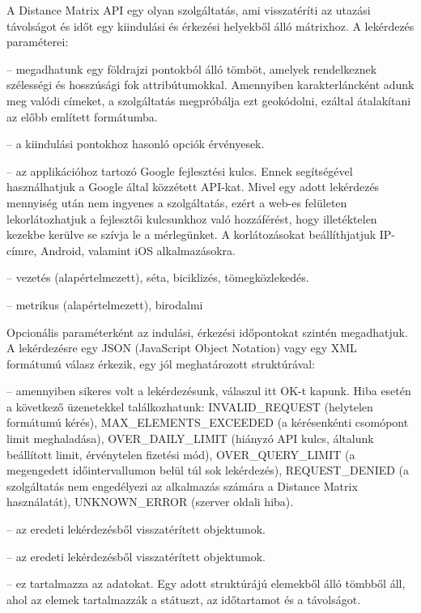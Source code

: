 A Distance Matrix API\cite{distance} egy olyan szolgáltatás, ami visszatéríti az utazási távolságot és időt egy kiindulási és érkezési helyekből álló mátrixhoz. A lekérdezés paraméterei:

\begin{description}
	\setlength{\itemsep}{0.04mm}
	\item[origins (kiindulási pontok)] -- megadhatunk egy földrajzi pontokból álló tömböt, amelyek rendelkeznek szélességi és hosszúsági fok attribútumokkal. Amennyiben karakterláncként adunk meg valódi címeket, a szolgáltatás megpróbálja ezt geokódolni, ezáltal átalakítani az előbb említett formátumba.
	\item[destinations (érkezési pontok)] --  a kiindulási pontokhoz hasonló opciók érvényesek.
	\item[key (kulcs)] -- az applikációhoz tartozó Google fejlesztési kulcs. Ennek segítségével használhatjuk a Google által közzétett API-kat. Mivel egy adott lekérdezés mennyiség után nem ingyenes a szolgáltatás, ezért a web-es felületen lekorlátozhatjuk a fejlesztői kulcsunkhoz való hozzáférést, hogy illetéktelen kezekbe kerülve se szívja le a mérlegünket. A korlátozásokat beállíthjatjuk IP-címre, Android, valamint iOS alkalmazásokra.
	\item[utazási mód (opcionális)] -- vezetés (alapértelmezett), séta, biciklizés, tömegközlekedés.
	\item[mértékegység (opcionális)] -- metrikus (alapértelmezett), birodalmi
\end{description}

Opcionális paraméterként az indulási, érkezési időpontokat szintén megadhatjuk. A lekérdezésre egy JSON (JavaScript Object Notation) vagy egy XML formátumú válasz érkezik, egy jól meghatározott struktúrával:

\begin{description}
	\setlength{\itemsep}{0.04mm}
	\item[státusz] -- amennyiben sikeres volt a lekérdezésunk, válaszul itt OK-t kapunk. Hiba esetén a következő üzenetekkel találkozhatunk: INVALID\_REQUEST (helytelen formátumú kérés), MAX\_ELEMENTS\_EXCEEDED (a kérésenkénti csomópont limit meghaladása), OVER\_DAILY\_LIMIT (hiányzó API kulcs, általunk beállított limit, érvénytelen fizetési mód), OVER\_QUERY\_LIMIT (a megengedett időintervallumon belül túl sok lekérdezés), REQUEST\_DENIED (a szolgáltatás nem engedélyezi az alkalmazás számára a Distance Matrix használatát), UNKNOWN\_ERROR (szerver oldali hiba).
	\item[kiindulási pontok címei] -- az eredeti lekérdezésből visszatérített objektumok.
	\item[érkezési pontok címei] -- az eredeti lekérdezésből visszatérített objektumok.
	\item[sorok] -- ez tartalmazza az adatokat. Egy adott struktúrájú elemekből álló tömbből áll, ahol az elemek tartalmazzák a státuszt, az időtartamot és a távolságot.
\end{description}

